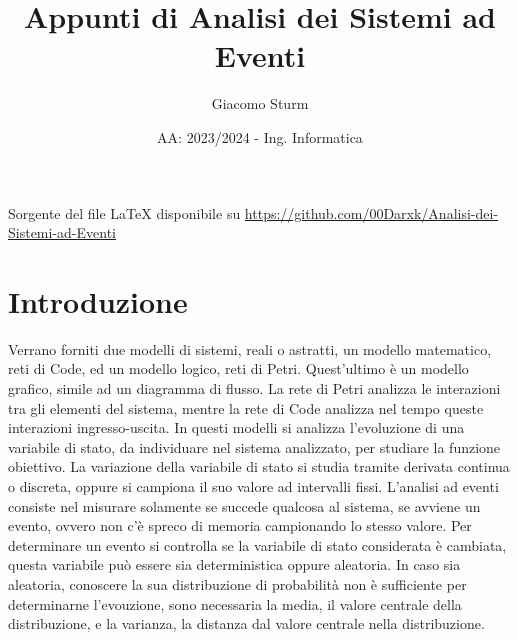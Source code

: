 \documentclass{article}
\title{Appunti di Analisi dei Sistemi ad Eventi}
\author{Giacomo Sturm}
\date{AA: 2023/2024 - Ing. Informatica}
\numberwithin{equation}{subsection}
\begin{document}

\pagestyle{fancy}
\fancyhead{}\fancyfoot{}
\fancyfoot[C]{\thepage}

\maketitle

\vspace{10mm}

\begin{center}
    Sorgente del file LaTeX disponibile su \url{https://github.com/00Darxk/Analisi-dei-Sistemi-ad-Eventi}
\end{center}

\clearpage

\tableofcontents

\clearpage


\section{Introduzione}

Verrano forniti due modelli di sistemi, reali o astratti, un modello matematico, reti di Code, ed un modello logico, reti di Petri. Quest'ultimo è un modello grafico, simile ad 
un diagramma di flusso. La rete di Petri analizza le interazioni tra gli elementi del sistema, mentre la rete di Code analizza nel tempo queste interazioni ingresso-uscita. 
In questi modelli si analizza l'evoluzione di una variabile di stato, da individuare nel sistema analizzato, per studiare la funzione obiettivo. La variazione della variabile 
di stato si studia tramite derivata continua o discreta, oppure si campiona il suo valore ad intervalli fissi. L'analisi ad eventi consiste nel misurare solamente se succede 
qualcosa al sistema, se avviene un evento, ovvero non c'è spreco di memoria campionando lo stesso valore. Per determinare un evento si controlla se la variabile di stato 
considerata è cambiata, questa variabile può essere sia deterministica oppure aleatoria. In caso sia aleatoria, conoscere la sua distribuzione di probabilità non è sufficiente 
per determinarne l'evouzione, sono necessaria la media, il valore centrale della distribuzione, e la varianza, la distanza dal valore centrale nella distribuzione. 
\end{document}
